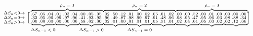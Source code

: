 \documentclass[12pt]{article}
\newcommand\undermat[2]{%
  \makebox[0pt][l]{$\smash{\underbrace{\phantom{%
    \begin{smallmatrix}#2\end{smallmatrix}}}_{\text{$#1$}}}$}#2}
\newcommand\overmat[2]{%
  \makebox[0pt][l]{$\smash{\overbrace{\phantom{%
    \begin{smallmatrix}#2\end{smallmatrix}}}^{\text{$#1$}}}$}#2}
\begin{document}
$$  \begin{smallmatrix}
    \Delta S_n < 0 \rightarrow \\
    \Delta S_n = 0 \rightarrow \\
    \Delta S_n > 0 \rightarrow
  \end{smallmatrix}
  \left [
    \begin{smallmatrix}
\overmat{\rho_n = 1}{.67 & .05 & .04 & .01 & .03 & .04 & .00 & .05 & .05} & \overmat{\rho_n = 2}{.02 & .50 & .12 & .01 & .00 & .02 & .05 & .01 & .02} & 
\overmat{\rho_n = 3}{.00 & .00 & .52 & .00 & .01 & .00 & .00 & .00 & .00} \\
.33 & .95 & .96 & .99 & .97 & .96 & .41 & .93 & .95 & .96 & .49 & .87 & .98 & .99 & .97 & .91 & .48 & .96 & .98 & .95 & .47 & .95 & .96 & .93 & .98 & .88 & .34 \\ \undermat{\Delta S_{n-1} < 0}{.00 & .00 & .00} & 
\undermat{}{.00 & .00 & .00} & 
\undermat{\Delta S_{n-1} > 0}{.58 & .02 & .00} & 
\undermat{}{.02 & .01 & .00} & 
\undermat{\Delta S_{n-1} = 0}{.01 & .01 & .01} & 
\undermat{}{.05 & .51 & .01} & 
\undermat{}{.02 & .04 & .01} & 
\undermat{}{.05 & .03 & .02} & 
\undermat{}{.02 & .12 & .66}
    \end{smallmatrix}
  \right ]
$$

\end{document}
